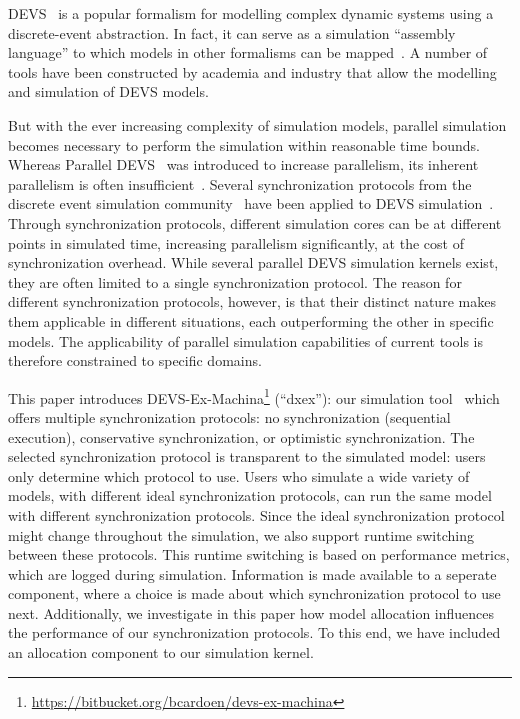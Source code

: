 \textsf{DEVS}~\cite{ClassicDEVS} is a popular formalism for modelling complex dynamic systems using a discrete-event abstraction.
In fact, it can serve as a simulation ``assembly language'' to which models in other formalisms can be mapped~\cite{DEVSbase}.
A number of tools have been constructed by academia and industry that allow the modelling and simulation of \textsf{DEVS} models.

But with the ever increasing complexity of simulation models, parallel simulation becomes necessary to perform the simulation within reasonable time bounds.
Whereas \textsf{Parallel DEVS}~\cite{ParallelDEVS} was introduced to increase parallelism, its inherent parallelism is often insufficient~\cite{Himmelspach}.
Several synchronization protocols from the discrete event simulation community~\cite{FujimotoBook} have been applied to \textsf{DEVS} simulation~\cite{globaltimewarp}.
Through synchronization protocols, different simulation cores can be at different points in simulated time, increasing parallelism significantly, at the cost of synchronization overhead.
While several parallel \textsf{DEVS} simulation kernels exist, they are often limited to a single synchronization protocol.
The reason for different synchronization protocols, however, is that their distinct nature makes them applicable in different situations, each outperforming the other in specific models.
The applicability of parallel simulation capabilities of current tools is therefore constrained to specific domains.

This paper introduces DEVS-Ex-Machina\footnote{\url{https://bitbucket.org/bcardoen/devs-ex-machina}} (``dxex''): our simulation tool~\cite{dxex} which offers multiple synchronization protocols: no synchronization (sequential execution), conservative synchronization, or optimistic synchronization.
The selected synchronization protocol is transparent to the simulated model: users only determine which protocol to use.
Users who simulate a wide variety of models, with different ideal synchronization protocols, can run the same model with different synchronization protocols.
Since the ideal synchronization protocol might change throughout the simulation, we also support runtime switching between these protocols.
This runtime switching is based on performance metrics, which are logged during simulation.
Information is made available to a seperate component, where a choice is made about which synchronization protocol to use next.
Additionally, we investigate in this paper how model allocation influences the performance of our synchronization protocols.
To this end, we have included an allocation component to our simulation kernel.

